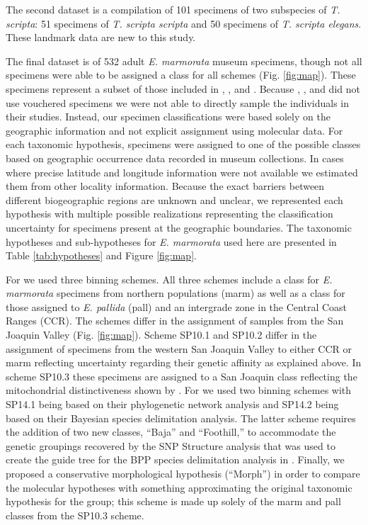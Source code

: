 \documentclass[11pt]{article}
\begin{document}
The second dataset is a compilation of 101 specimens of two subspecies of \textit{T. scripta}: 51 specimens of \textit{T. scripta scripta} and 50 specimens of \textit{T. scripta elegans}. These landmark data are new to this study. 

The final dataset is of 532 adult \textit{E. marmorata} museum specimens, though not all specimens were able to be assigned a class for all schemes (Fig. \ref{fig:map}). These specimens represent a subset of those included in \citet{Angielczyk2007}, \citet{Angielczyk2011}, and \citet{Angielczyk2013a}. Because  \citet{Spinks2005}, \citet{Spinks2010}, and \citet{Spinks2014} did not use vouchered specimens we were not able to directly sample the individuals in their studies. Instead, our specimen classifications were based solely on the geographic information and not explicit assignment using molecular data. For each taxonomic hypothesis, specimens were assigned to one of the possible classes based on geographic occurrence data recorded in museum collections. In cases where precise latitude and longitude information were not available we estimated them from other locality information. Because the exact barriers between different biogeographic regions are unknown and unclear, we represented each hypothesis with multiple possible realizations representing the classification uncertainty for specimens present at the geographic boundaries. The taxonomic hypotheses and sub-hypotheses for \textit{E. marmorata} used here are presented in Table \ref{tab:hypotheses} and Figure \ref{fig:map}.

For \citet{Spinks2010} we used three binning schemes. All three schemes include a class for \textit{E. marmorata} specimens from northern populations (marm) as well as a class for those assigned to \textit{E. pallida} (pall) and an intergrade zone in the Central Coast Ranges (CCR). The schemes differ in the assignment of samples from the San Joaquin Valley (Fig. \ref{fig:map}). Scheme SP10.1 and SP10.2 differ in the assignment of specimens from the western San Joaquin Valley to either CCR or marm reflecting uncertainty regarding their genetic affinity as explained above. In scheme SP10.3 these specimens are assigned to a San Joaquin class reflecting the mitochondrial distinctiveness shown by \citet{Spinks2005}. For \citet{Spinks2014} we used two binning schemes with SP14.1 being based on their phylogenetic network analysis and SP14.2 being based on their Bayesian species delimitation analysis. The latter scheme requires the addition of two new classes, ``Baja'' and ``Foothill,'' to accommodate the genetic groupings recovered by the SNP Structure analysis that was used to create the guide tree for the BPP species delimitation analysis in \citet{Spinks2014}. Finally, we proposed a conservative morphological hypothesis (``Morph'') in order to compare the molecular hypotheses with something approximating the original taxonomic hypothesis for the group; this scheme is made up solely of the marm and pall classes from the SP10.3 scheme.
\end{document}
